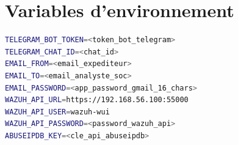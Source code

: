 \documentclass[12pt,a4paper]{report}
\begin{document}
\chapter{Variables d'environnement}
\label{annexe:env}

\begin{lstlisting}[style=mycode, language=bash,
  caption={Fichier api/.env — configuration de l'API}]
TELEGRAM_BOT_TOKEN=<token_bot_telegram>
TELEGRAM_CHAT_ID=<chat_id>
EMAIL_FROM=<email_expediteur>
EMAIL_TO=<email_analyste_soc>
EMAIL_PASSWORD=<app_password_gmail_16_chars>
WAZUH_API_URL=https://192.168.56.100:55000
WAZUH_API_USER=wazuh-wui
WAZUH_API_PASSWORD=<password_wazuh_api>
ABUSEIPDB_KEY=<cle_api_abuseipdb>
\end{lstlisting}
\end{document}
